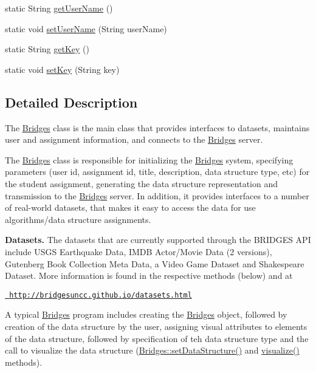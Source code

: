 \begin{DoxyCompactItemize}
\item 
static String \mbox{\hyperlink{classbridges_1_1connect_1_1_bridges_a75f047cda3100e0cfa88378293c12961}{get\+User\+Name}} ()
\item 
static void \mbox{\hyperlink{classbridges_1_1connect_1_1_bridges_af9b9a2ca03ba02c0c2be4716594678a6}{set\+User\+Name}} (String user\+Name)
\item 
static String \mbox{\hyperlink{classbridges_1_1connect_1_1_bridges_a426897d6e5449601bb4e20c32b8346f5}{get\+Key}} ()
\item 
static void \mbox{\hyperlink{classbridges_1_1connect_1_1_bridges_ab69e89ec7d2e674a8b8c4b0be0c63397}{set\+Key}} (String key)
\end{DoxyCompactItemize}


\subsection{Detailed Description}
The \mbox{\hyperlink{classbridges_1_1connect_1_1_bridges}{Bridges}} class is the main class that provides interfaces to datasets, maintains user and assignment information, and connects to the \mbox{\hyperlink{classbridges_1_1connect_1_1_bridges}{Bridges}} server. 

The \mbox{\hyperlink{classbridges_1_1connect_1_1_bridges}{Bridges}} class is responsible for initializing the \mbox{\hyperlink{classbridges_1_1connect_1_1_bridges}{Bridges}} system, specifying parameters (user id, assignment id, title, description, data structure type, etc) for the student assignment, generating the data structure representation and transmission to the \mbox{\hyperlink{classbridges_1_1connect_1_1_bridges}{Bridges}} server. In addition, it provides interfaces to a number of real-\/world datasets, that makes it easy to access the data for use algorithms/data structure assignments. ~\newline


{\bfseries{Datasets.}} The datasets that are currently supported through the B\+R\+I\+D\+G\+ES A\+PI include U\+S\+GS Earthquake Data, I\+M\+DB Actor/\+Movie Data (2 versions), Gutenberg Book Collection Meta Data, a Video Game Dataset and Shakespeare Dataset. More information is found in the respective methods (below) and at 

\href{http://bridgesuncc.github.io/datasets.html}{\texttt{ http\+://bridgesuncc.\+github.\+io/datasets.\+html}} 

A typical \mbox{\hyperlink{classbridges_1_1connect_1_1_bridges}{Bridges}} program includes creating the \mbox{\hyperlink{classbridges_1_1connect_1_1_bridges}{Bridges}} object, followed by creation of the data structure by the user, assigning visual attributes to elements of the data structure, followed by specification of teh data structure type and the call to visualize the data structure (\mbox{\hyperlink{classbridges_1_1connect_1_1_bridges_a921a6603b2445b1abe30a1b3d6f0c255}{Bridges\+::set\+Data\+Structure()}} and \mbox{\hyperlink{classbridges_1_1connect_1_1_bridges_a1853d64ffb8675ba2ec227a2b819cd24}{visualize()}} methods).


